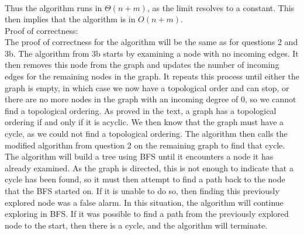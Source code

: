 \documentclass{assignment}
\begin{document}
\begin{problemlist}
\begin{answer}
\begin{align*}
\end{align*}
Thus the algorithm runs in $\Theta (n+m)$, as the limit resolves to a constant. This then implies that the algorithm is in $O(n+m)$.\\
Proof of correctness:\\
The proof of correctness for the algorithm will be the same as for questions 2 and 3b. The algorithm from 3b starts by examining a node with no incoming edges. It then removes this node from the graph and updates the number of incoming edges for the remaining nodes in the graph. It repeats this process until either the graph is empty, in which case we now have a topological order and can stop, or there are no more nodes in the graph with an incoming degree of 0, so we cannot find a topological ordering. As proved in the text, a graph has a topological ordering if and only if it is acyclic. We then know that the graph must have a cycle, as we could not find a topological ordering. The algorithm then calls the modified algorithm from question 2 on the remaining graph to find that cycle. The algorithm will build a tree using BFS until it encounters a node it has already examined. As the graph is directed, this is not enough to indicate that a cycle has been found, so it must then attempt to find a path back to the node that the BFS started on. If it is unable to do so, then finding this previously explored node was a false alarm. In this situation, the algorithm will continue exploring in BFS. If it was possible to find a path from the previously explored node to the start, then there is a cycle, and the algorithm will terminate.
\end{answer}

\end{problemlist}
\end{document}
